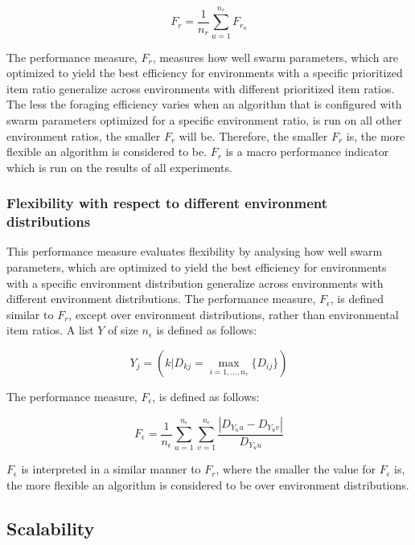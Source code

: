\begin{equation}
F_r = \dfrac{1}{n_r}\sum_{u=1}^{n_r} F_{r_u}
\end{equation}

The performance measure, $F_r$, measures how well swarm parameters, which are optimized to yield the best efficiency for environments with a specific prioritized item ratio generalize across environments with different prioritized item ratios. The less the foraging efficiency varies when an algorithm that is configured with swarm parameters optimized for a specific environment ratio, is run on all other environment ratios, the smaller $F_r$ will be. Therefore, the smaller $F_r$ is, the more flexible an algorithm is considered to be. $F_r$ is a macro performance indicator which is run on the results of all experiments. 


\subsubsection{Flexibility with respect to different environment distributions}
\label{setup:flexibility:environmentdistributions}


This performance measure evaluates flexibility by analysing how well swarm parameters, which are optimized to yield the best efficiency for environments with a specific environment distribution generalize across environments with different environment distributions. The performance measure, $F_{\epsilon}$, is defined similar to $F_r$, except over environment distributions, rather than environmental item ratios. A list $Y$ of size $n_\epsilon$ is defined as follows:

\begin{equation}
Y_j = ( k | D_{kj} = \max_{i=1,...,n_\tau}\{D_{ij}\} )
\end{equation}

The performance measure, $F_\epsilon$, is defined as follows:

\begin{equation}
F_\epsilon = \dfrac{1}{n_\epsilon}\sum_{u=1}^{n_\epsilon} \sum_{v=1}^{n_\epsilon}\dfrac{|D_{Y_uu}- D_{Y_uv}|}{D_{Y_uu}}
\end{equation}

$F_\epsilon$ is interpreted in a similar manner to $F_r$, where the smaller the value for $F_\epsilon$ is, the more flexible an algorithm is considered to be over environment distributions.

\subsection{Scalability}
\label{setup:scalability}

